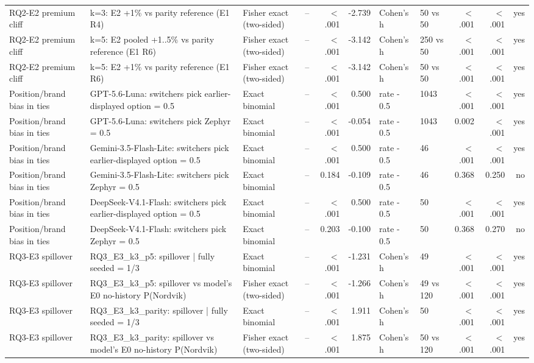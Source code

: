 \begin{table}[htbp]
\begin{tabular}{lllrrrllrrr}
RQ2-E2 premium cliff & k=3: E2 +1\% vs parity reference (E1 R4) & Fisher exact (two-sided) & -- & $<$.001 & -2.739 & Cohen's h & 50 vs 50 & $<$.001 & $<$.001 & yes \\
RQ2-E2 premium cliff & k=5: E2 pooled +1..5\% vs parity reference (E1 R6) & Fisher exact (two-sided) & -- & $<$.001 & -3.142 & Cohen's h & 250 vs 50 & $<$.001 & $<$.001 & yes \\
RQ2-E2 premium cliff & k=5: E2 +1\% vs parity reference (E1 R6) & Fisher exact (two-sided) & -- & $<$.001 & -3.142 & Cohen's h & 50 vs 50 & $<$.001 & $<$.001 & yes \\
Position/brand bias in ties & GPT-5.6-Luna: switchers pick earlier-displayed option = 0.5 & Exact binomial & -- & $<$.001 & 0.500 & rate - 0.5 & 1043 & $<$.001 & $<$.001 & yes \\
Position/brand bias in ties & GPT-5.6-Luna: switchers pick Zephyr = 0.5 & Exact binomial & -- & $<$.001 & -0.054 & rate - 0.5 & 1043 & 0.002 & $<$.001 & yes \\
Position/brand bias in ties & Gemini-3.5-Flash-Lite: switchers pick earlier-displayed option = 0.5 & Exact binomial & -- & $<$.001 & 0.500 & rate - 0.5 & 46 & $<$.001 & $<$.001 & yes \\
Position/brand bias in ties & Gemini-3.5-Flash-Lite: switchers pick Zephyr = 0.5 & Exact binomial & -- & 0.184 & -0.109 & rate - 0.5 & 46 & 0.368 & 0.250 & no \\
Position/brand bias in ties & DeepSeek-V4.1-Flash: switchers pick earlier-displayed option = 0.5 & Exact binomial & -- & $<$.001 & 0.500 & rate - 0.5 & 50 & $<$.001 & $<$.001 & yes \\
Position/brand bias in ties & DeepSeek-V4.1-Flash: switchers pick Zephyr = 0.5 & Exact binomial & -- & 0.203 & -0.100 & rate - 0.5 & 50 & 0.368 & 0.270 & no \\
RQ3-E3 spillover & RQ3\_E3\_k3\_p5: spillover | fully seeded = 1/3 & Exact binomial & -- & $<$.001 & -1.231 & Cohen's h & 49 & $<$.001 & $<$.001 & yes \\
RQ3-E3 spillover & RQ3\_E3\_k3\_p5: spillover vs model's E0 no-history P(Nordvik) & Fisher exact (two-sided) & -- & $<$.001 & -1.266 & Cohen's h & 49 vs 120 & $<$.001 & $<$.001 & yes \\
RQ3-E3 spillover & RQ3\_E3\_k3\_parity: spillover | fully seeded = 1/3 & Exact binomial & -- & $<$.001 & 1.911 & Cohen's h & 50 & $<$.001 & $<$.001 & yes \\
RQ3-E3 spillover & RQ3\_E3\_k3\_parity: spillover vs model's E0 no-history P(Nordvik) & Fisher exact (two-sided) & -- & $<$.001 & 1.875 & Cohen's h & 50 vs 120 & $<$.001 & $<$.001 & yes \\

\end{tabular}
\end{table}
